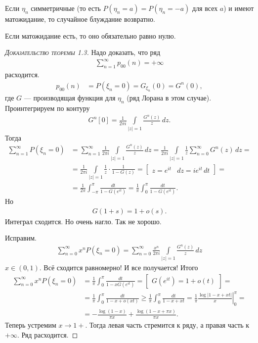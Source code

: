 \documentclass[../main.tex]{subfiles}
\begin{document}
\begin{thm}
 Если $ \eta_n $ симметричные (то есть $ P(\eta_n = a) = P(\eta_n = -a) $ для всех $ a $) и имеют матожидание, то случайное блуждание возвратно.
\end{thm}
\begin{remrk*}
 Если матожидание есть, то оно обязательно равно нулю.
\end{remrk*}
\begin{proof}[\normalfont\textsc{Доказательство теоремы 1.3}]
 Надо доказать, что ряд
 \begin{align*}
  \sum_{n=1}^{\infty}p_{00}(n) = +\infty
 \end{align*} расходится.
 \begin{align*}
  p_{00}(n)&=P(\xi_n=0)=G_{\xi_n}(0) = G^{n}(0),
 \end{align*} где $ G $ --- производящая функция для $ \eta_n $ (ряд Лорана в этом случае). Проинтегрируем по контуру
 \begin{align*}
  G^{n}[0] = \frac{1}{2\pi i} \int\limits_{\left| z \right|=1}   \frac{G^{n}(z)}{z}\,dz.
 \end{align*} Тогда
 \begin{align*}
  \sum_{n=1}^{\infty}P(\xi_n=0)&=\sum_{n=1}^{\infty} \frac{1}{2\pi i} \int\limits_{\left| z \right|=1}   \frac{G^{n}(z)}{z}\,dz = \frac{1}{2\pi i} \int\limits_{\left| z \right|=1} \frac{1}{z} \sum_{n=0}^{\infty} G^{n}(z)\,dz = \\
  &= \frac{1}{2\pi i} \int\limits_{\left| z \right|=1} \frac{1}{z} \cdot \frac{1}{1 - G(z)} = \begin{bmatrix}
   z = e^{it} & dz = ie^{it}\,dt
  \end{bmatrix} = \\
 &= \frac{1}{2\pi } \int_{-\pi}^{\pi} \frac{dt}{1 - G(e^{it})} = \frac{1}{\pi} \int_{0}^{\pi} \frac{dt}{1 - G(e^{it})}.
 \end{align*} Но
 \begin{align*}
  G(1+s) = 1 + o(s).
 \end{align*} Интеграл сходится. Но очень нагло. Так не хорошо.

 Исправим.
 \begin{align*}
  \sum_{n=0}^{\infty} x^{n}P(\xi_n=0) = \sum_{n=0}^{\infty} \frac{x^{n}}{2\pi i} \int\limits_{\left| z \right|=1}   \frac{G^{n}(z)}{z}\,dz
 \end{align*} $ x \in (0,1) $. Всё сходится равномерно! И все получается! Итого
 \begin{align*}
  \sum_{n=0}^{\infty}x^{n}P(\xi_n=0) &= \frac{1}{\pi}\int_{0}^{\pi} \frac{dt}{1-xG(e^{it})} = \begin{bmatrix}
   G(e^{it}) = 1 + o(t)
  \end{bmatrix} = \\
  &= \frac{1}{\pi} \int_{0}^{\pi} \frac{dt}{1-x + o(xt)} \geqslant \frac{1}{\pi} \int_{0}^{\pi}  \frac{dt}{1-x+xt} = \frac{1}{\pi} \left.\frac{\log \left| 1-x+xt \right|}{x}\right|_0^{\pi} = \\
   &= -\frac{\log(1-x)}{\pi x} + \frac{\log(1-x+\pi x)}{\pi x}.
  \end{align*} Теперь устремим $ x \to 1+  $. Тогда левая часть стремится к ряду, а правая часть к $ +\infty $. Ряд расходится.
\end{proof}
\end{document}
